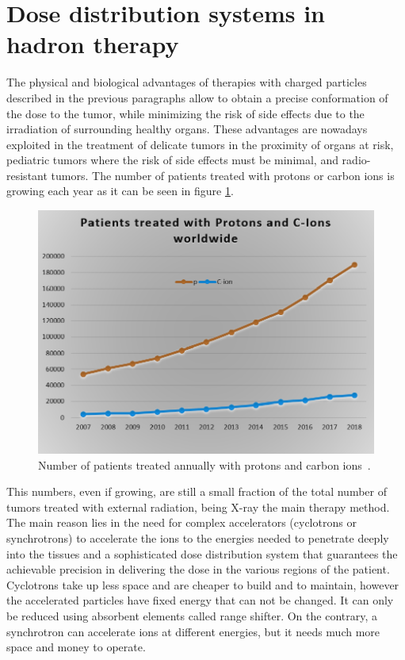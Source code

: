 \section{Dose distribution systems in hadron therapy}
The physical and biological advantages of therapies with charged particles described in the previous paragraphs allow to obtain a precise conformation of the dose to the tumor, while minimizing the risk of side effects due to the irradiation of surrounding healthy organs.
These advantages are nowadays exploited in the treatment of delicate tumors in the proximity of organs at risk, pediatric tumors where the risk of side effects must be minimal, and radio-resistant tumors.
The number of patients treated with protons or carbon ions is growing each year as it can be seen in figure \ref{fig:patientstreated}.
\begin{figure}[H]
	\centering
	\includegraphics[width=0.7\linewidth]{IMG/ch1/PatientsTreated2}
	\caption{Number of patients treated annually with protons and carbon ions~\cite{world}.}
	\label{fig:patientstreated}
\end{figure}
\noindent This numbers, even if growing, are still a small fraction of the total number of tumors treated with external radiation, being X-ray the main therapy method. 
The main reason lies in the need for complex accelerators (cyclotrons or synchrotrons) to accelerate the ions to
the energies needed to penetrate deeply into the tissues and a sophisticated dose distribution system that guarantees the achievable precision in delivering the dose in the various regions of the patient.
\newline
Cyclotrons take up less space and are cheaper to build and to maintain, however the accelerated particles have fixed energy that can not be changed. It can only be reduced using absorbent elements called range shifter.
On the contrary, a synchrotron can accelerate ions at different energies, but it needs much more space and money to operate.
